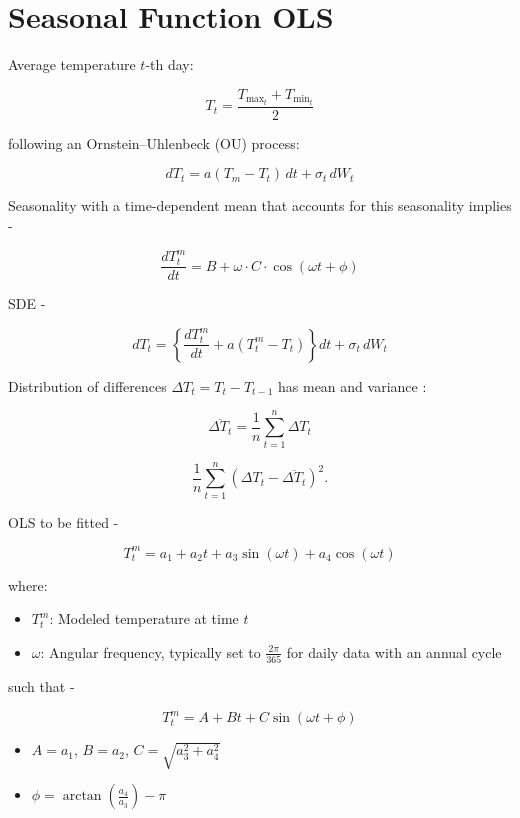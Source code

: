 \documentclass{article}
\begin{document}
\section*{Seasonal Function OLS}

Average temperature \( t \)-th day:

\[
T_t = \frac{T_{\text{max}_t} + T_{\text{min}_t}}{2}
\]

following an Ornstein–Uhlenbeck (OU) process:

\[
dT_t = a(T_m - T_t) \, dt + \sigma_t \, dW_t
\]

Seasonality with a time-dependent mean that accounts for this seasonality implies - 

\[
\frac{dT_t^m}{dt} = B + \omega \cdot C \cdot \cos(\omega t + \phi)
\]

SDE - 

\[
dT_t = \left\{ \frac{dT_t^m}{dt} + a(T_t^m - T_t) \right\} dt + \sigma_t \, dW_t
\]

Distribution of  differences \( \Delta T_t = T_t - T_{t-1} \) has mean and variance :

\[
\overline{\Delta T_t} = \frac{1}{n} \sum_{t=1}^n \Delta T_t
\]

\[
\frac{1}{n} \sum_{t=1}^n (\Delta T_t - \overline{\Delta T_t})^2.
\]

OLS to be fitted - 

\[
T_t^{m} = a_1 + a_2 t + a_3 \sin(\omega t) + a_4 \cos(\omega t)
\]

where:
\begin{itemize}
    \item \( T_t^{m} \): Modeled temperature at time \( t \)
    \item \( \omega \): Angular frequency, typically set to \( \frac{2\pi}{365} \) for daily data with an annual cycle
\end{itemize}

such that - 

\[
T_t^{m} = A + B t + C \sin(\omega t + \phi)
\]

\begin{itemize}
    \item \( A = a_1 \), \( B = a_2 \), \( C = \sqrt{a_3^2 + a_4^2} \)
    \item \( \phi = \arctan\left(\frac{a_4}{a_3}\right) - \pi \)
\end{itemize}
\end{document}
